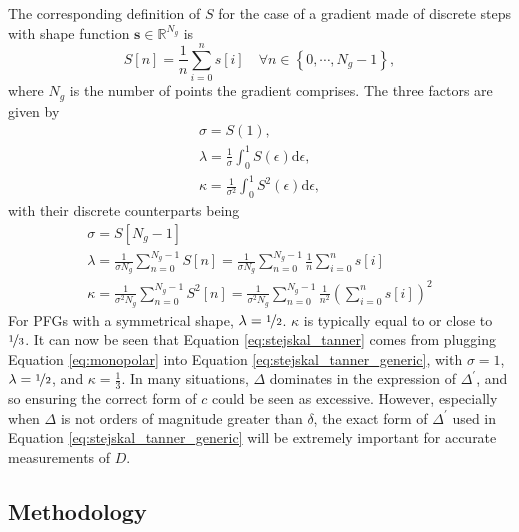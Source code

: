 The corresponding definition of $S$ for the case of a gradient made of discrete
steps with shape function $\symbf{s} \in \mathbb{R}^{N_g}$ is
\begin{equation}
    S\left[n\right] =
        \frac{1}{n} \sum_{i = 0}^{n} s\left[i\right] \quad
        \forall n \in \left\lbrace 0, \cdots, N_g - 1\right\rbrace,
\end{equation}
where $N_g$ is the number of points the gradient comprises. The three factors
are given by
\begin{subequations}
    \begin{gather}
        \sigma = S(1),\\
        \lambda = \frac{1}{\sigma} \int_0^1 S(\epsilon) \mathrm{d} \epsilon,\\
        \kappa = \frac{1}{\sigma^2} \int_0^1 S^2(\epsilon) \mathrm{d} \epsilon,
    \end{gather}
\end{subequations}
with their discrete counterparts being
\begin{subequations}
    \begin{gather}
        \sigma = S\left[N_g - 1\right] \\
        \lambda = \frac{1}{\sigma N_g} \sum_{n = 0}^{N_g - 1} S\left[n\right]
            = \frac{1}{\sigma N_g} \sum_{n = 0}^{N_g - 1}
            \frac{1}{n} \sum_{i=0}^{n} s\left[i\right]\\
        \kappa = \frac{1}{\sigma^2 N_g} \sum_{n = 0}^{N_g - 1} S^2\left[n\right]
            = \frac{1}{\sigma^2 N_g} \sum_{n = 0}^{N_g - 1}
            \frac{1}{n^2} \left(\sum_{i=0}^{n} s\left[i\right]\right)^2
    \end{gather}
\end{subequations}
For \acp{PFG} with a symmetrical shape, $\lambda = \nicefrac{1}{2}$. $\kappa$
is typically equal to or close to $\nicefrac{1}{3}$. It can now be seen that
Equation \ref{eq:stejskal_tanner} comes from plugging Equation
\ref{eq:monopolar} into Equation \ref{eq:stejskal_tanner_generic}, with $\sigma
= 1$,  $\lambda = \nicefrac{1}{2}$, and  $\kappa = \frac{1}{3}$. In many
situations,  $\Delta$ dominates in the expression of $\Delta^{\prime}$, and so
ensuring the correct form of $c$ could be seen as excessive. However,
especially when  $\Delta$ is not orders of magnitude greater than $\delta$, the
exact form of $\Delta^{\prime}$ used in Equation
\ref{eq:stejskal_tanner_generic} will be extremely important for accurate
measurements of $D$.


\subsection{Methodology}

